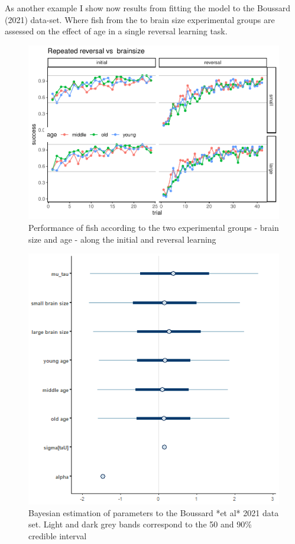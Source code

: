 \documentclass[
]{article}
\begin{document}
As another example I show now results from fitting the model to the
Boussard (2021) data-set. Where fish from the to brain size experimental
groups are assessed on the effect of age in a single reversal learning
task.

\begin{figure}

\includegraphics{report_files/figure-latex/unnamed-chunk-13-1} \hfill{}

\caption{Performance of fish according to the two experimental groups  - brain size and age - along the initial and reversal learning}\label{fig:unnamed-chunk-13}
\end{figure}

\begin{figure}

\includegraphics[width=6.67in,]{images/boussard2intervals_tau} \hfill{}

\caption{Bayesian estimation of parameters to the Boussard *et al* 2021 data set. Light and dark grey bands correspond to the 50 and 90\% credible interval}\label{fig:unnamed-chunk-14}
\end{figure}
\end{document}
